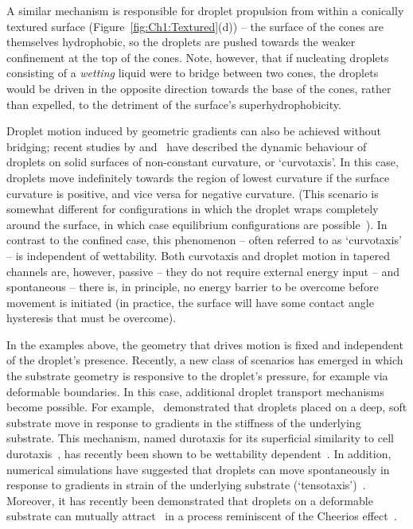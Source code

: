 A similar mechanism is responsible for droplet propulsion from within a conically textured surface (Figure~\ref{fig:Ch1:Textured}(d)) -- the surface of the cones are themselves hydrophobic, so the droplets are pushed towards the weaker confinement at the top of the cones. Note, however, that if nucleating droplets consisting of a \textit{wetting} liquid were to bridge between two cones, the droplets would be driven in the opposite direction towards the base of the cones, rather than expelled, to the detriment of the surface's superhydrophobicity.

Droplet motion induced by geometric gradients can also be achieved without bridging; recent studies by \cite{Lv2014PRL} and~\cite{McCarthy2019SoftMatter} have described the dynamic behaviour of droplets on solid surfaces of non-constant curvature, or `curvotaxis'. In this case, droplets move indefinitely towards the region of lowest curvature if the surface curvature is positive, and vice versa for negative curvature. (This scenario is somewhat different for configurations in which the droplet wraps completely around the surface, in which case equilibrium configurations are possible~\citep{Lorenceau1999JFM, Michielsen2011Langmuir}). In contrast to the confined case, this phenomenon -- often referred to as `curvotaxis' -- is independent of wettability. Both curvotaxis and droplet motion in tapered channels are, however, passive -- they do not require external energy input -- and spontaneous -- there is, in principle,  no energy barrier to be overcome before movement is initiated (in practice, the surface will have some contact angle hysteresis that must be overcome).

In the examples above, the geometry that drives motion is fixed and independent of the droplet's presence. Recently, a new class of scenarios has emerged in which the substrate geometry is responsive to the droplet's pressure, for example via deformable boundaries. In this case, additional droplet  transport mechanisms become possible. For example,~\cite{Style2013PNAS} demonstrated that droplets placed on a deep, soft substrate move in response to gradients in the stiffness of the underlying substrate. This mechanism, named durotaxis for its superficial similarity to cell durotaxis~\citep{Lo2000Biophys}, has recently been shown to be wettability dependent~\citep{Bueno2018SoftMatter}. In addition, numerical simulations have suggested that droplets can move spontaneously in response to gradients in strain of the underlying substrate (`tensotaxis')~\citep{Bueno2017EML}. Moreover, it has recently been demonstrated that droplets on a deformable substrate can mutually attract~\citep{Karpitschka2016PNAS} in a process reminiscent of the Cheerios effect~\citep{Vella2005AJP}.

